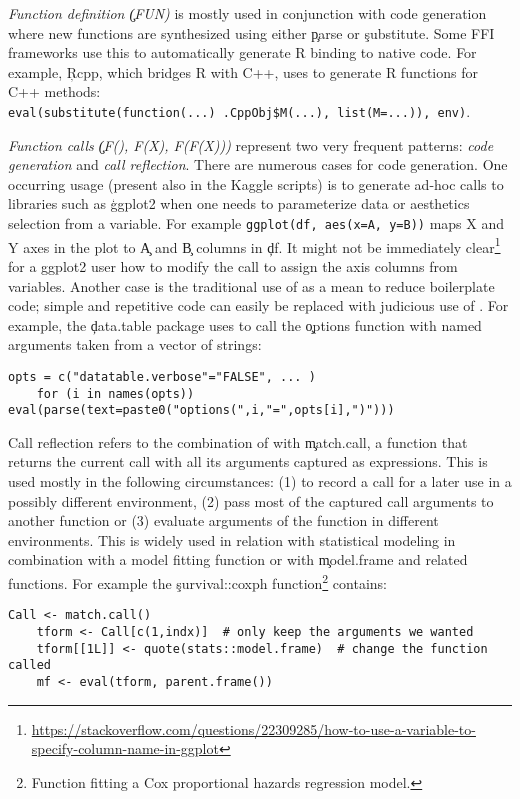 \documentclass[review,screen,acmsmall,anonymous=true]{acmart}
\begin{document}
\begin{compactitem}[---]
  \item \emph{Function definition \c{(FUN)}} is mostly used in conjunction with
    code generation where new functions are synthesized using either \c{parse}
    or \c{substitute}. Some FFI frameworks use this to automatically generate R
    binding to native code. For example, \c{Rcpp}, which bridges R with C++,
    uses \eval to generate R functions for C++ methods:\\
    \lstinline|eval(substitute(function(...) .CppObj$M(...), list(M=...)), env)|.

  \item \emph{Function calls \c{(F(), F(X), F(F(X)))}} represent two very
    frequent patterns: \emph{code generation} and \emph{call reflection}. There
    are numerous cases for code generation.
    One occurring usage (present also in the Kaggle scripts) is to generate
    ad-hoc calls to libraries such as \c{ggplot2} when one needs to
    parameterize data or aesthetics selection from a variable. For example
    \lstinline|ggplot(df, aes(x=A, y=B))| maps X and Y axes in the plot to
    \c{A} and \c{B} columns in \c{df}. It might not be immediately
    clear\footnote{\cf
    \url{https://stackoverflow.com/questions/22309285/how-to-use-a-variable-to-specify-column-name-in-ggplot}}
    for a ggplot2 user how to modify the call to assign the axis columns from
    variables. Another case is the traditional use of \eval as a mean to reduce
    boilerplate code; simple and repetitive code can easily be replaced with
    judicious use of \eval. For example, the \c{data.table} package uses \eval
    to call the \c{options} function with named arguments taken from a vector
    of strings:
    
    \begin{lstlisting}[gobble=2]
    opts = c("datatable.verbose"="FALSE", ... )
    for (i in names(opts)) eval(parse(text=paste0("options(",i,"=",opts[i],")")))
    \end{lstlisting}

    Call reflection refers to the combination of \eval with \c{match.call}, a
    function that returns the current call with all its arguments captured as
    expressions. This is used mostly in the following circumstances: (1) to
    record a call for a later use in a possibly different environment, (2) pass
    most of the captured call arguments to another function or (3) evaluate
    arguments of the function in different environments. This is widely used in
    relation with statistical modeling in combination with a model fitting
    function or with \c{model.frame} and related functions. For example the
    \c{survival::coxph} function\footnote{Function fitting a Cox proportional hazards
    regression model.} contains:
    \begin{lstlisting}[gobble=2]
    Call <- match.call()
    tform <- Call[c(1,indx)]  # only keep the arguments we wanted
    tform[[1L]] <- quote(stats::model.frame)  # change the function called
    mf <- eval(tform, parent.frame())
    \end{lstlisting}


\end{compactitem}
\end{document}
